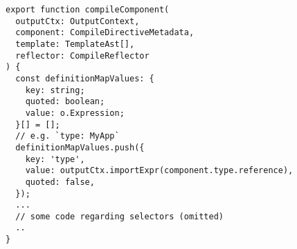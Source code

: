 \begin{verbatim}
export function compileComponent(
  outputCtx: OutputContext,
  component: CompileDirectiveMetadata,
  template: TemplateAst[],
  reflector: CompileReflector
) {
  const definitionMapValues: {
    key: string;
    quoted: boolean;
    value: o.Expression;
  }[] = [];
  // e.g. `type: MyApp`
  definitionMapValues.push({
    key: 'type',
    value: outputCtx.importExpr(component.type.reference),
    quoted: false,
  });
  ...
  // some code regarding selectors (omitted)
  ..
}
\end{verbatim}
